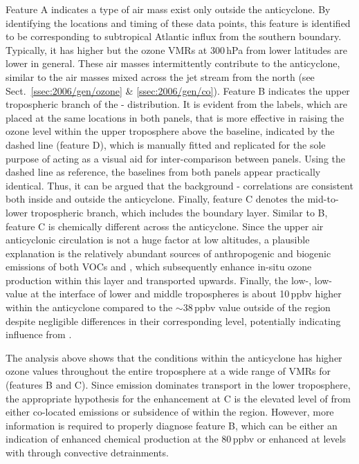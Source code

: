 Feature A indicates a type of air mass exist only outside the anticyclone. By identifying the locations and timing of these data points,
this feature is identified to be corresponding to subtropical Atlantic
influx from the southern boundary. Typically, it has higher  but the ozone VMRs at 300\,\unit{hPa} from lower latitudes are
lower in general. These air masses intermittently contribute to the anticyclone, similar to the air masses mixed across the jet stream
from the north (see Sect.~\ref{ssec:2006/gen/ozone} \& \ref{ssec:2006/gen/co}). Feature B indicates the upper tropospheric branch
of the - distribution. It is evident from the labels, which are placed at the same locations in both panels, that
 is more effective in raising the ozone level within the upper troposphere above the baseline, indicated by the dashed
line (feature D), which is manually fitted and replicated for the sole purpose of acting as a visual aid for inter-comparison between
panels. Using the dashed line as reference, the baselines from both panels appear practically identical. Thus, it can be argued that the background
- correlations are consistent both inside and outside the anticyclone. Finally, feature C denotes the mid-to-lower
tropospheric branch, which includes the boundary layer. Similar to B, feature C is chemically different across the anticyclone. Since the upper air anticyclonic circulation
is not a huge factor at low altitudes, a plausible explanation is the relatively abundant sources of anthropogenic and biogenic emissions of both
VOCs and , which subsequently enhance in-situ ozone production within this layer and transported upwards. Finally,
the low-, low-  value at the interface of lower and middle tropospheres is about 10\,\unit{ppbv} higher within
the anticyclone compared to the $\sim38$\,\unit{ppbv} value outside of the region despite negligible differences in their corresponding
 level, potentially indicating influence from .

The analysis above shows that the conditions within the anticyclone has higher ozone values throughout the entire troposphere at
a wide range of VMRs for  (features B and C). Since emission dominates transport in the lower
troposphere, the appropriate hypothesis for the enhancement at C is the elevated level of  from either co-located
emissions or subsidence of {\lnox} within the region. However, more information is required to properly diagnose feature B, which
can be either an indication of enhanced  chemical production at the 80\,\unit{ppbv}  or enhanced 
at levels with  through convective detrainments.

